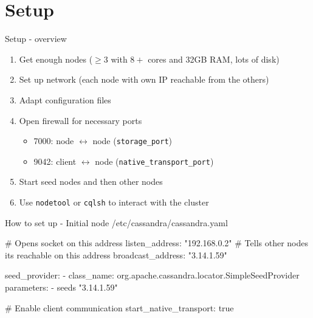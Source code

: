 \documentclass[
  10pt
]{beamer}
\begin{document}
\section{Setup}  %

\begin{frame}{Setup - overview}
  \begin{enumerate}
    \item<1-> Get enough nodes ($\geq3$ with $8+$ cores and 32GB RAM, lots of disk)
    \item<2-> Set up network (each node with own IP reachable from the others)
    \item<3-> Adapt configuration files
    \item<4-> Open firewall for necessary ports
    \begin{itemize}
      \item 7000: node $\leftrightarrow$ node (\lstinline{storage_port})
      \item 9042: client $\leftrightarrow$ node (\lstinline{native_transport_port})
    \end{itemize}
    \item<5-> Start seed nodes and then other nodes
    \item<6-> Use \lstinline{nodetool} or \lstinline{cqlsh} to interact with the cluster
  \end{enumerate}
\end{frame}

\begin{frame}[fragile]{How to set up - Initial node}
  /etc/cassandra/cassandra.yaml
  \begin{semiverbatim}
# Opens socket on this address
listen_address: "192.168.0.2"
# Tells other nodes its reachable on this address
broadcast_address: "3.14.1.59"

seed_provider:
  - class_name: org.apache.cassandra.locator.SimpleSeedProvider
    parameters:
      - seeds "3.14.1.59"

# Enable client communication
start_native_transport: true
  \end{semiverbatim}
\end{frame}
\end{document}
